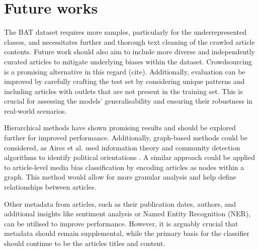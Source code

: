 

\section{Future works}

The BAT dataset requires more samples, particularly for the underrepresented classes, and necessitates further and thorough text cleaning of the crawled article contents. Future work should also aim to include more diverse and independently curated articles to mitigate underlying biases within the dataset. Crowdsourcing is a promising alternative in this regard (cite). Additionally, evaluation can be improved by carefully crafting the test set by considering unique patterns and including articles with outlets that are not present in the training set. This is crucial for assessing the models' generalisability and ensuring their robustness in real-world scenarios.

Hierarchical methods have shown promising results and should be explored further for improved performance. Additionally, graph-based methods could be considered, as Aires et al. used information theory and community detection algorithms to identify political orientations \cite{aires-2020-information}. A similar approach could be applied to article-level media bias classification by encoding articles as nodes within a graph. This method would allow for more granular analysis and help define relationships between articles.

Other metadata from articles, such as their publication dates, authors, and additional insights like sentiment analysis or Named Entity Recognition (NER), can be utilised to improve performance. However, it is arguably crucial that metadata should remain supplemental, while the primary basis for the classifier should continue to be the articles titles and content.



